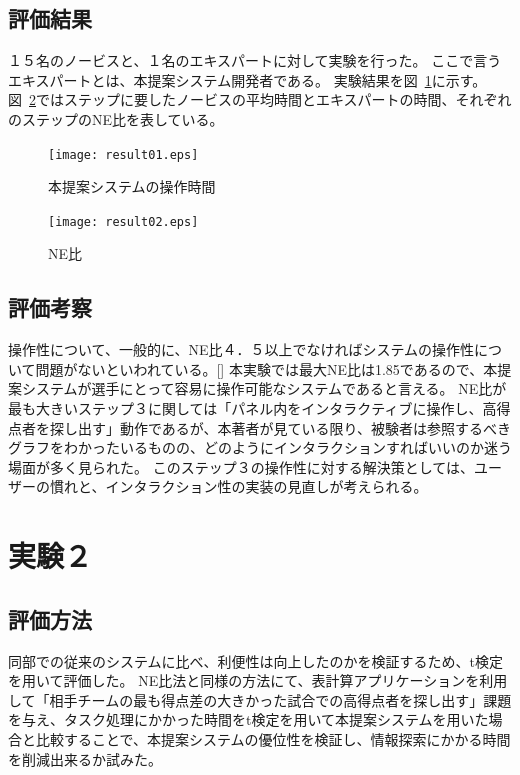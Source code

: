 \documentclass[sotsuron]{kuee}
\begin{document}
		\subsection{評価結果}
			１５名のノービスと、１名のエキスパートに対して実験を行った。
			ここで言うエキスパートとは、本提案システム開発者である。
			実験結果を図~\ref{fig:result01}に示す。
			図~\ref{fig:result02}ではステップに要したノービスの平均時間とエキスパートの時間、それぞれのステップのNE比を表している。
			\begin{figure}
				\begin{center}
					\texttt{[image: result01.eps]}
				\end{center}
				\caption{本提案システムの操作時間}
		  		\label{fig:result01}
			\end{figure}
			\begin{figure}
				\begin{center}
					\texttt{[image: result02.eps]}
				\end{center}
				\caption{NE比}
		  		\label{fig:result02}
			\end{figure}
		\subsection{評価考察}
			操作性について、一般的に、NE比４．５以上でなければシステムの操作性について問題がないといわれている。[]
			本実験では最大NE比は1.85であるので、本提案システムが選手にとって容易に操作可能なシステムであると言える。
			NE比が最も大きいステップ３に関しては「パネル内をインタラクティブに操作し、高得点者を探し出す」動作であるが、本著者が見ている限り、被験者は参照するべきグラフをわかったいるものの、どのようにインタラクションすればいいのか迷う場面が多く見られた。
			このステップ３の操作性に対する解決策としては、ユーザーの慣れと、インタラクション性の実装の見直しが考えられる。
	\section{実験２}
		\subsection{評価方法}
			同部での従来のシステムに比べ、利便性は向上したのかを検証するため、t検定を用いて評価した。
			NE比法と同様の方法にて、表計算アプリケーションを利用して「相手チームの最も得点差の大きかった試合での高得点者を探し出す」課題を与え、タスク処理にかかった時間をt検定を用いて本提案システムを用いた場合と比較することで、本提案システムの優位性を検証し、情報探索にかかる時間を削減出来るか試みた。
\end{document}
